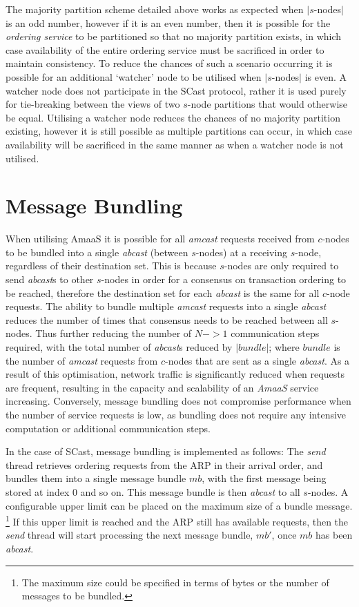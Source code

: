     The majority partition scheme detailed above works as expected when $|s$-nodes$|$ is an odd number, however if it is an even number, then it is possible for the \emph{ordering service} to be partitioned so that no majority partition exists, in which case availability of the entire ordering service must be sacrificed in order to maintain consistency.  To reduce the chances of such a scenario occurring it is possible for an additional \textquoteleft{}watcher' node to be utilised when $|s$-nodes$|$ is even.  A watcher node does not participate in the \textsf{SCast} protocol, rather it is used purely for tie-breaking between the views of two $s$-node partitions that would otherwise be equal.  Utilising a watcher node reduces the chances of no majority partition existing, however it is still possible as multiple partitions can occur, in which case availability will be sacrificed in the same manner as when a watcher node is not utilised.  

\section{Message Bundling}\label{ssec:abaas_optimisations}
		When utilising \textsf{AmaaS} it is possible for all \emph{amcast} requests received from $c$-nodes to be bundled into a single \emph{abcast} (between $s$-nodes) at a receiving $s$-node, regardless of their destination set.  This is because $s$-nodes are only required to send \emph{abcast}s to other $s$-nodes in order for a consensus on transaction ordering to be reached, therefore the destination set for each \emph{abcast} is the same for all $c$-node requests.   The ability to bundle multiple \emph{amcast} requests into a single \emph{abcast} reduces the number of times that consensus needs to be reached between all $s$-nodes.  Thus further reducing the number of $N->1$ communication steps required, with the total number of \emph{abcast}s reduced by $\left\vert bundle \right\vert$; where $bundle$ is the number of  \emph{amcast} requests from $c$-nodes that are sent as a single \emph{abcast}.  As a result of this optimisation, network traffic is significantly reduced when requests are frequent, resulting in the capacity and scalability of an \emph{AmaaS} service increasing. Conversely, message bundling does not compromise performance when the number of service requests is low, as bundling does not require any intensive computation or additional communication steps.  
    
    In the case of \textsf{SCast}, message bundling is implemented as follows: The \emph{send} thread retrieves ordering requests from the ARP in their arrival order, and bundles them into a single message bundle $mb$, with the first message being stored at index 0 and so on.  This message bundle is then \emph{abcast} to all $s$-nodes.  A configurable upper limit can be placed on the maximum size of a bundle message. \footnote{The maximum size could be specified in terms of bytes or the number of messages to be bundled.} If this upper limit is reached and the ARP still has available requests, then the \emph{send} thread will start processing the next message bundle, $mb'$, once $mb$ has been \emph{abcast}.  
    
